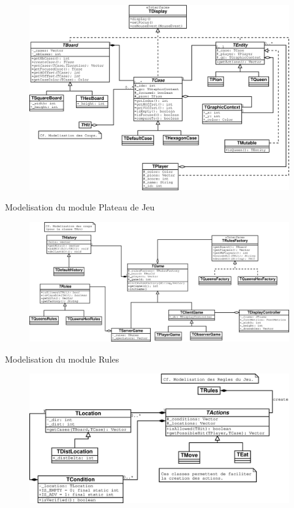 \documentclass[french,12pt]{report}
\begin{document}
\begin{center}

\begin{figure}[h]
\includegraphics[width=16cm]{MPlateau.eps}
\end{figure}

Modelisation du module Plateau de Jeu

\pagebreak

\begin{figure}[h]
\includegraphics[width=16cm]{MRules.eps}
\end{figure}

Modelisation du module Rules

\pagebreak

\begin{figure}[h]
\includegraphics[width=16cm]{MActions.eps}
\end{figure}


\end{center}
\end{document}
